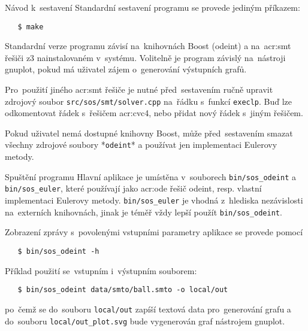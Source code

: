 \documentclass[thesis=M,czech]{FITthesis}[2012/06/26]
\newcommand{\acrlabel}[1]{acr:#1}
\newcommand{\acr}[1]{\acrshort{\acrlabel{#1}}}
\newcommand{\id}[1]{\texttt{#1}}
\newcommand{\binDir}{\id{bin}}
\newcommand{\binFn}[1]{\id{\binDir{}/\-#1}}
\newcommand{\srcDir}{\id{src}}
\newcommand{\srcFn}[1]{\id{\srcDir{}/\-#1}}
\begin{document}

\begin{section}{Návod k~sestavení}\label{s:usage:build}
Standardní sestavení programu se provede jediným příkazem:
\begin{verbatim}
   $ make
\end{verbatim}
Standardní verze programu závisí na~knihovnách Boost (odeint)
a na~\acr{smt} řešiči z3 nainstalovaném v~systému.
Volitelně je program závislý na~nástroji gnuplot,
pokud má uživatel zájem o~generování výstupních grafů.

Pro~použití jiného \acr{smt} řešiče
je nutné před~sestavením ručně upravit zdrojový soubor
\srcFn{sos/\-smt/\-solver.cpp} na~řádku s~funkcí \id{execlp}.
Buď lze odkomentovat řádek s~řešičem \acr{cvc}4,
nebo přidat nový řádek s~jiným řešičem.

Pokud uživatel nemá dostupné knihovny Boost,
může před~sestavením smazat všechny zdrojové soubory *\id{odeint}*
a používat jen implementaci Eulerovy metody.
\end{section} %


\begin{section}{Spuštění programu}\label{s:usage:run}
Hlavní aplikace je umístěna v~souborech \binFn{sos\_\-odeint}
a \binFn{sos\_\-euler}, které používají jako \acr{ode} řešič
odeint, resp. vlastní implementaci Eulerovy metody.
\binFn{sos\_\-euler} je vhodná z~hlediska nezávislosti
na~externích knihovnách, jinak je téměř vždy lepší použít
\binFn{sos\_\-odeint}.

Zobrazení zprávy s~povolenými vstupními parametry aplikace
se provede pomocí
\begin{verbatim}
   $ bin/sos_odeint -h
\end{verbatim}

Příklad použití se~vstupním i~výstupním souborem:
\begin{verbatim}
   $ bin/sos_odeint data/smto/ball.smto -o local/out
\end{verbatim}
po~čemž se do~souboru \id{local/\-out}
zapíší textová data pro~generování grafu
a do~souboru \id{local/\-out\_\-plot.svg}
bude vygenerován graf nástrojem gnuplot.
\end{section} %


\end{document}
